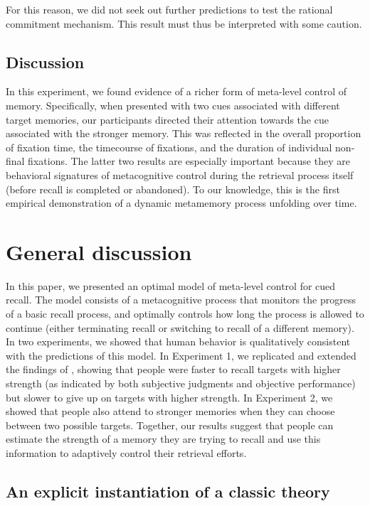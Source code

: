 For this reason, we did not seek out further predictions to test the rational commitment mechanism. This result must thus be interpreted with some caution.

\subsection{Discussion}

In this experiment, we found evidence of a richer form of meta-level control of memory. Specifically, when presented with two cues associated with different target memories, our participants directed their attention towards the cue associated with the stronger memory. This was reflected in the overall proportion of fixation time, the timecourse of fixations, and the duration of individual non-final fixations. The latter two results are especially important because they are behavioral signatures of metacognitive control during the retrieval process itself (before recall is completed or abandoned). To our knowledge, this is the first empirical demonstration of a dynamic metamemory process unfolding over time. 

\section{General discussion}

In this paper, we presented an optimal model of meta-level control for cued recall. The model consists of a metacognitive process that monitors the progress of a basic recall process, and optimally controls how long the process is allowed to continue (either terminating recall or switching to recall of a different memory). In two experiments, we showed that human behavior is qualitatively consistent with the predictions of this model. In Experiment 1, we replicated and extended the findings of \citet{costermans1992confidence}, showing that people were faster to recall targets with higher strength (as indicated by both subjective judgments and objective performance) but slower to give up on targets with higher strength. In Experiment 2, we showed that people also attend to stronger memories when they can choose between two possible targets. Together, our results suggest that people can estimate the strength of a memory they are trying to recall and use this information to adaptively control their retrieval efforts.

\subsection{An explicit instantiation of a classic theory}

